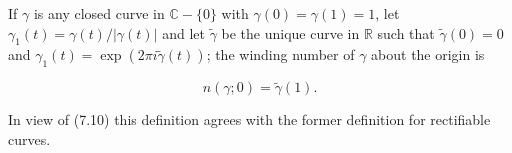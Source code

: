 If $\gamma$ is any closed curve in $\mathbb{C} - \{0\}$ with $\gamma(0) = \gamma(1) = 1$, let $\gamma_1(t) = \gamma(t)/|\gamma(t)|$ and let $\tilde{\gamma}$ be the unique curve in $\mathbb{R}$ such that $\tilde{\gamma}(0) = 0$ and $\gamma_1(t) = \exp(2\pi i \tilde{\gamma}(t))$; the winding number of $\gamma$ about the origin is

$$n(\gamma; 0) = \tilde{\gamma}(1).$$

In view of (7.10) this definition agrees with the former definition for rectifiable curves.